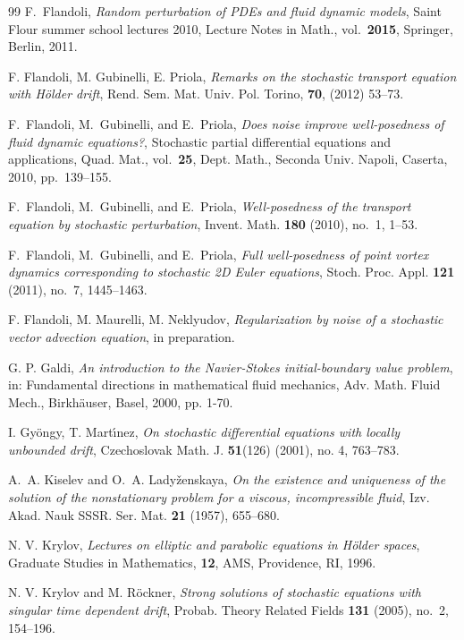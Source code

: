 \documentclass[a4paper,10pt]{article}
\begin{document}
\begin{thebibliography}{99}
F.~Flandoli, \textit{Random perturbation of {PDE}s and fluid dynamic models},
  Saint Flour summer school lectures 2010, Lecture Notes in Math.,
  vol.~{\bf2015}, Springer, Berlin, 2011.

F. Flandoli, M. Gubinelli, E. Priola, \textit{Remarks on the
stochastic transport equation with H\"{o}lder drift}, Rend. Sem. Mat. Univ.
Pol. Torino, \textbf{70}, (2012) 53--73.

F.~Flandoli, M.~Gubinelli, and E.~Priola, \textit{Does noise improve
  well-posedness of fluid dynamic equations?}, Stochastic partial differential
  equations and applications, Quad. Mat., vol.~{\bf25}, Dept. Math., Seconda
  Univ. Napoli, Caserta, 2010, pp.~139--155.

F.~Flandoli, M.~Gubinelli, and E.~Priola, \textit{Well-posedness of the transport equation by stochastic perturbation}, Invent. Math. \textbf{{\bf180}} (2010), no.~1, 1--53.

F.~Flandoli, M.~Gubinelli, and E.~Priola, \textit{Full well-posedness of point vortex dynamics corresponding to   stochastic 2D Euler equations}, Stoch. Proc. Appl. \textbf{{\bf121}} (2011),
  no.~7, 1445--1463.

F. Flandoli, M. Maurelli, M. Neklyudov, \textit{Regularization by noise of a
stochastic vector advection equation}, in preparation.

G. P. Galdi, \textit{An introduction to the Navier-Stokes
initial-boundary value problem}, in: Fundamental directions in mathematical
fluid mechanics, Adv. Math. Fluid Mech., Birkh\"{a}user, Basel, 2000, pp. 1-70.

I. Gy\"{o}ngy, T. Mart\'{\i}nez, \textit{On stochastic differential equations with
locally unbounded drift}, Czechoslovak Math. J. \textbf{51}(126)
(2001), no. 4, 763--783.

A.~A. Kiselev and O.~A. Lady{\v{z}}enskaya, \emph{On the existence and
  uniqueness of the solution of the nonstationary problem for a viscous,
  incompressible fluid}, Izv. Akad. Nauk SSSR. Ser. Mat. \textbf{{\bf 21}}
  (1957), 655--680.
  
N. V. Krylov, \textit{Lectures on elliptic and parabolic equations in H\"older spaces}, Graduate Studies in Mathematics, \textbf{12}, AMS, Providence, RI, 1996.

N. V. Krylov and M. R{\"o}ckner, \textit{Strong solutions of stochastic equations
  with singular time dependent drift}, Probab. Theory Related Fields
  \textbf{{\bf131}} (2005), no.~2, 154--196.


\end{thebibliography}
\end{document}
